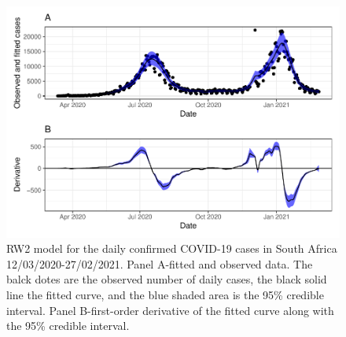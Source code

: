 \documentclass[10pt,letterpaper]{article}
\begin{document}
\begin{figure}[h]
	\includegraphics[width=0.95\linewidth]{COVIDincidenceSA_files/figure-latex/unnamed-chunk-7-1} \caption{RW2 model for the daily confirmed COVID-19 cases in South Africa 12/03/2020-27/02/2021.  Panel A-fitted and observed data. The balck dotes are the observed number of daily cases, the black solid line the fitted curve, and the blue shaded area is the 95\% credible interval. Panel B-first-order derivative of the fitted curve along with the 95\% credible interval.}\label{fig:unnamed-chunk-7}
\end{figure}
\end{document}

